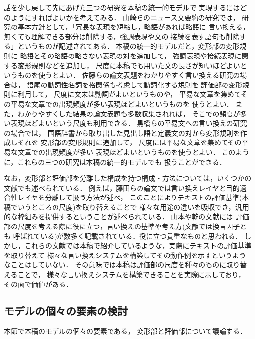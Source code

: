 話を少し戻して先にあげた三つの研究を本稿の統一的モデルで
実現するにはどのようにすればよいかを考えてみる．
山崎らのニュース文要約の研究\cite{yamasaki_NLP98}では，
研究の基本方針として，「冗長な表現を短縮し，略語があれば略語に
言い換える，無くても理解できる部分は削除する，強調表現や文の
接続を表す語句も削除する」というものが記述されてある．
本稿の統一的モデルだと，変形部の変形規則に
略語とその略語の略さない表現の対を追加して，
強調表現や接続表現に関する変形規則などを追加し，
尺度に本稿でも用いた文の長さが短いほどよいというものを使うとよい．
佐藤らの論文表題をわかりやすく言い換える研究\cite{sato_ronbun_iikae}の場合は，
語尾の動詞性名詞を格関係も考慮して動詞化する規則を
評価部の変形規則に利用して，
尺度に文末は動詞がよいというものや，
平易な文章を集めてその平易な文章での出現頻度が多い表現ほどよいというものを
使うとよい．
また，わかりやすくした結果の論文表題も多数収集されれば，
そこでの頻度が多い表現ほどよいという尺度も利用できる．
黒橋らの平易文への言い換えの研究\cite{kurohashi_nlp2001ws_true}の場合では，
国語辞書から取り出した見出し語と定義文の対から変形規則を作成しそれを
変形部の変形規則に追加して，
尺度には平易な文章を集めてその平易な文章での出現頻度が多い
表現ほどよいというものを使うとよい．
このように，これらの三つの研究は本稿の統一的モデルでも
扱うことができる．

なお，変形部と評価部を分離した構成を持つ構成・方法については，いくつかの文献\cite{yamamoto_nlp2001ws_true,inui_iikae_tutorial,fujita_ipsj2003}でも述べられている．
例えば，藤田らの論文\cite{fujita_ipsj2003}では言い換えレイヤと目的適合性レイヤを分離して扱う方法が述べ，
このことによりテキストの評価基準(本稿でいうところの尺度)を取り替えることで
様々な用途の違いを吸収でき，汎用的な枠組みを提供するということが述べられている．
山本や乾の文献\cite{yamamoto_nlp2001ws_true,inui_iikae_tutorial}には
評価部の尺度を考える際に役に立つ，言い換えの基準や考え方(文献では換言因子とも
呼ばれている)が数多く記載されている．役に立つ貴重なものと思われる．
しかし，これらの文献では本稿で紹介しているような，実際にテキストの評価基準を取り替えて
様々な言い換えシステムを構築してその動作例を示すというようなことはしていない．
その意味では本稿は評価部の尺度を種々のものに取り替えることで，
様々な言い換えシステムを構築できることを実際に示しており，その面で価値がある．

\subsection{モデルの個々の要素の検討}

本節で本稿のモデルの個々の要素である，
変形部と評価部について議論する．

